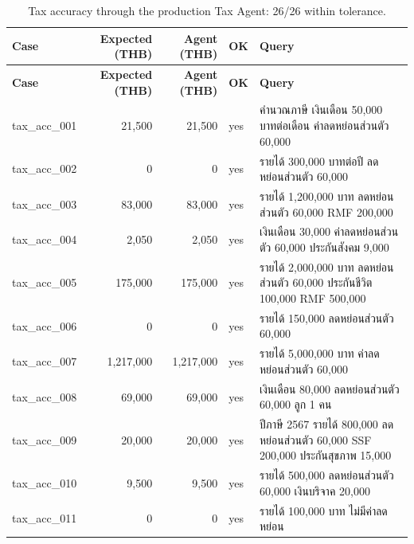 \documentclass[11pt,a4paper]{article}
\begin{document}
{\scriptsize
\begin{longtable}{lrrlp{8.6cm}}
\caption{Tax accuracy through the production Tax Agent: 26/26 within tolerance.}\label{tab:tax-acc}\\
\toprule
\textbf{Case} & \textbf{Expected (THB)} & \textbf{Agent (THB)} & \textbf{OK} & \textbf{Query} \\
\midrule
\endfirsthead
\toprule
\textbf{Case} & \textbf{Expected (THB)} & \textbf{Agent (THB)} & \textbf{OK} & \textbf{Query} \\
\midrule
\endhead
\bottomrule
\endfoot
tax\_\allowbreak{}acc\_\allowbreak{}001 & 21,500 & 21,500 & yes & {\thaifont คำนวณภาษี เงินเดือน }50,000 {\thaifont บาทต่อเดือน ค่าลดหย่อนส่วนตัว }60,000 \\
tax\_\allowbreak{}acc\_\allowbreak{}002 & 0 & 0 & yes & {\thaifont รายได้ }300,000 {\thaifont บาทต่อปี ลดหย่อนส่วนตัว }60,000 \\
tax\_\allowbreak{}acc\_\allowbreak{}003 & 83,000 & 83,000 & yes & {\thaifont รายได้ }1,200,000 {\thaifont บาท ลดหย่อนส่วนตัว }60,000 RMF 200,000 \\
tax\_\allowbreak{}acc\_\allowbreak{}004 & 2,050 & 2,050 & yes & {\thaifont เงินเดือน }30,000 {\thaifont ค่าลดหย่อนส่วนตัว }60,000 {\thaifont ประกันสังคม }9,000 \\
tax\_\allowbreak{}acc\_\allowbreak{}005 & 175,000 & 175,000 & yes & {\thaifont รายได้ }2,000,000 {\thaifont บาท ลดหย่อนส่วนตัว }60,000 {\thaifont ประกันชีวิต }100,000 RMF 500,000 \\
tax\_\allowbreak{}acc\_\allowbreak{}006 & 0 & 0 & yes & {\thaifont รายได้ }150,000 {\thaifont ลดหย่อนส่วนตัว }60,000 \\
tax\_\allowbreak{}acc\_\allowbreak{}007 & 1,217,000 & 1,217,000 & yes & {\thaifont รายได้ }5,000,000 {\thaifont บาท ค่าลดหย่อนส่วนตัว }60,000 \\
tax\_\allowbreak{}acc\_\allowbreak{}008 & 69,000 & 69,000 & yes & {\thaifont เงินเดือน }80,000 {\thaifont ลดหย่อนส่วนตัว }60,000 {\thaifont ลูก }1 {\thaifont คน} \\
tax\_\allowbreak{}acc\_\allowbreak{}009 & 20,000 & 20,000 & yes & {\thaifont ปีภาษี }2567 {\thaifont รายได้ }800,000 {\thaifont ลดหย่อนส่วนตัว }60,000 SSF 200,000 {\thaifont ประกันสุขภาพ }15,000 \\
tax\_\allowbreak{}acc\_\allowbreak{}010 & 9,500 & 9,500 & yes & {\thaifont รายได้ }500,000 {\thaifont ลดหย่อนส่วนตัว }60,000 {\thaifont เงินบริจาค }20,000 \\
tax\_\allowbreak{}acc\_\allowbreak{}011 & 0 & 0 & yes & {\thaifont รายได้ }100,000 {\thaifont บาท ไม่มีค่าลดหย่อน} \\

\end{longtable}}
\end{document}
